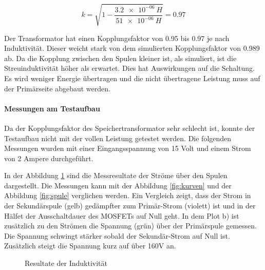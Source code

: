 \begin{equation}\label{eq:berechnung_k2}
k = \sqrt{1-\frac{\SI{3.2e-06}{H}}{\SI{51e-06}{H}}}=0.97
\end{equation}

Der Transformator hat einen Kopplungsfaktor von 0.95 bis 0.97 je nach Induktivität. Dieser weicht stark von dem simulierten Kopplungsfaktor von 0.989 ab. Da die Kopplung zwischen den Spulen kleiner ist, als simuliert, ist die Streuinduktivität höher als erwartet. Dies hat Auswirkungen auf die Schaltung. Es wird weniger Energie übertragen und die nicht übertragene Leistung muss auf der Primärseite abgebaut werden.  

\paragraph{Messungen am Testaufbau}
Da der Kopplungsfaktor des Speichertransformator sehr schlecht ist, konnte der Testaufbau nicht mit der vollen Leistung getestet werden. Die folgenden Messungen wurden mit einer Eingangsspannung von 15 Volt und einem Strom von 2 Ampere durchgeführt.   

In der Abbildung \ref{fig:mess_ströme} sind die Messresultate der Ströme über den Spulen dargestellt. Die Messungen kann mit der Abbildung \ref{fig:kurven} und der Abbildung \ref{fig:spule} verglichen werden. Ein Vergleich zeigt, dass der Strom in der Sekundärspule (gelb) gedämpfter zum Primär-Strom (violett) ist und in der Hälfet der Ausschaltdauer des MOSFETs auf Null geht. In dem Plot b) ist zusätzlich zu den Strömen die Spannung (grün) über der Primärspule gemessen. Die Spannung schwingt stärker sobald der Sekundär-Strom auf Null ist. Zusätzlich steigt die Spannung kurz auf über 160V an. 

\begin{figure}[H]
	\centering
	\qquad
	\caption{Resultate der Induktivität}
	\label{fig:mess_ströme}
\end{figure}


